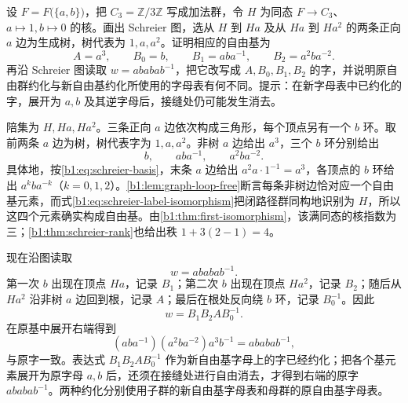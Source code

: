 \begin{optionalexercise}\label{b1:ex:08-index-three}
	设 \(F=F\bigl(\{a,b\}\bigr)\)，把 \(C_3=\mathbb Z/3\mathbb Z\) 写成加法群，令 \(H\) 为同态 \(F\to C_3\)、\(a\mapsto1,b\mapsto0\) 的核。画出 Schreier 图，选从 \(H\) 到 \(Ha\) 及从 \(Ha\) 到 \(Ha^2\) 的两条正向 \(a\) 边为生成树，树代表为 \(1,a,a^2\)。证明相应的自由基为
	\[
		A=a^3,\qquad B_0=b,\qquad B_1=aba^{-1},\qquad B_2=a^2ba^{-2}.
	\]
	再沿 Schreier 图读取 \(w=ababab^{-1}\)，把它改写成 \(A,B_0,B_1,B_2\) 的字，并说明原自由群约化与新自由基约化所使用的字母表有何不同。提示：在新字母表中已约化的字，展开为 \(a,b\) 及其逆字母后，接缝处仍可能发生消去。
\end{optionalexercise}
\begin{solution}
	陪集为 \(H,Ha,Ha^2\)。三条正向 \(a\) 边依次构成三角形，每个顶点另有一个 \(b\) 环。取前两条 \(a\) 边为树，树代表字为 \(1,a,a^2\)。非树 \(a\) 边给出 \(a^3\)，三个 \(b\) 环分别给出
	\[
		b,\qquad aba^{-1},\qquad a^2ba^{-2}.
	\]
	具体地，按\eqref{b1:eq:schreier-basis}，末条 \(a\) 边给出 \(a^2a\cdot1^{-1}=a^3\)，各顶点的 \(b\) 环给出 \(a^kba^{-k}\)（\(k=0,1,2\)）。\cref{b1:lem:graph-loop-free}断言每条非树边恰对应一个自由基元素，而式\eqref{b1:eq:schreier-label-isomorphism}把闭路径群同构地识别为 \(H\)，所以这四个元素确实构成自由基。由\cref{b1:thm:first-isomorphism}，该满同态的核指数为三；\cref{b1:thm:schreier-rank}也给出秩 \(1+3(2-1)=4\)。

	现在沿图读取
	\[
		w=ababab^{-1}.
	\]
	第一次 \(b\) 出现在顶点 \(Ha\)，记录 \(B_1\)；第二次 \(b\) 出现在顶点 \(Ha^2\)，记录 \(B_2\)；随后从 \(Ha^2\) 沿非树 \(a\) 边回到根，记录 \(A\)；最后在根处反向绕 \(b\) 环，记录 \(B_0^{-1}\)。因此
	\[
		w=B_1B_2AB_0^{-1}.
	\]
	在原基中展开右端得到
	\[
		(aba^{-1})(a^2ba^{-2})a^3b^{-1} =ababab^{-1},
	\]
	与原字一致。表达式 \(B_1B_2AB_0^{-1}\) 作为新自由基字母上的字已经约化；把各个基元素展开为原字母 \(a,b\) 后，还须在接缝处进行自由消去，才得到右端的原字 \(ababab^{-1}\)。两种约化分别使用子群的新自由基字母表和母群的原自由基字母表。
\end{solution}

